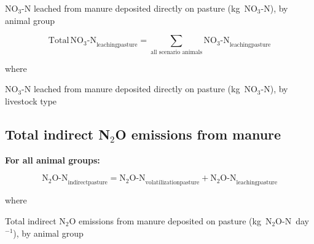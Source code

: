 \begin{description}[font=\normalfont, leftmargin=12em, style=nextline, nosep]
    \item[$\mathrm{NO_3\text{-}N}_{\mathrm{leachingpasture}}$]
        NO$_3$-N leached from manure deposited directly on pasture (kg~NO$_3$-N),
        by animal group
\end{description}

\begin{equation}
    \mathrm{Total\,NO_3\text{-}N}_{\mathrm{leachingpasture}}
        = \sum_{\text{all scenario animals}}
          \mathrm{NO_3\text{-}N}_{\mathrm{leachingpasture}}
    \tag{Eq.\ 5.4.4-5}
\end{equation}

\noindent where

\begin{description}[font=\normalfont, leftmargin=12em, style=nextline, nosep]
    \item[$\mathrm{Total\,NO_3\text{-}N}_{\mathrm{leachingpasture}}$]
        NO$_3$-N leached from manure deposited directly on pasture
        (kg~NO$_3$-N), by livestock type
\end{description}

\subsection{Total indirect N\texorpdfstring{$_2$}{2}O emissions from manure}
\label{subsec:grazing-total-indirect}

\noindent\textbf{For all animal groups:}

\begin{equation}
    \mathrm{N_2O\text{-}N}_{\mathrm{indirectpasture}}
        = \mathrm{N_2O\text{-}N}_{\mathrm{volatilizationpasture}}
          + \mathrm{N_2O\text{-}N}_{\mathrm{leachingpasture}}
    \tag{Eq.\ 5.4.5-1}
\end{equation}

\noindent where

\begin{description}[font=\normalfont, leftmargin=12em, style=nextline, nosep]
    \item[$\mathrm{N_2O\text{-}N}_{\mathrm{indirectpasture}}$]
        Total indirect N$_2$O emissions from manure deposited on pasture
        (kg~N$_2$O-N~day$^{-1}$), by animal group
\end{description}


